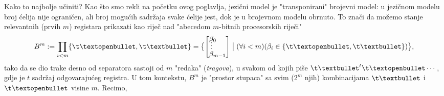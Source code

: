 Kako to najbolje učiniti? Kao što smo rekli na početku ovog poglavlja, jezični model je "transponirani" brojevni model: u jezičnom modelu broj ćelija nije ograničen, ali broj mogućih sadržaja svake ćelije jest, dok je u brojevnom modelu obrnuto. To znači da možemo stanje relevantnih (prvih $m$) registara prikazati kao riječ nad "abecedom $m$-bitnih procesorskih riječi"
\begin{equation}
\renewcommand{\arraystretch}{0.1}
    B^m:=\prod_{i<m}\{\t\textopenbullet,\t\textbullet\}=\bigl\{\left[\begin{array}{@{}l@{}}\beta_0\\[-2mm]
        \vdotswithin{\beta}\\[1mm]
    \beta_{m-1}\end{array}\right]\bigm|(\forall i<m)(\beta_i\in\{\t\textopenbullet,\t\textbullet\})\bigr\}\text,
\end{equation}
tako da se dio trake desno od separatora sastoji od $m$ "redaka" (\emph{tragova}), u svakom od kojih piše $\t\textbullet^t\t\textopenbullet\dotsm$, gdje je $t$ sadržaj odgovarajućeg registra. U tom kontekstu, $B^m$ je "prostor stupaca" sa svim ($2^m$ njih) kombinacijama $\t\textbullet$ i $\t\textopenbullet$ visine $m$. Recimo,
